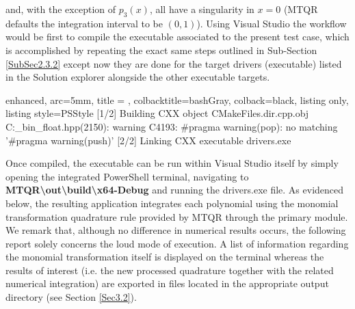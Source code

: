 \documentclass[a4paper, twosided]{book}
\begin{document}
\noindent
and, with the exception of $p_3(x)$, all have a singularity in $x=0$ (MTQR defaults the integration interval to be $(0,1)$). Using Visual Studio the workflow would be first to compile the executable associated to the present test case, which is accomplished by repeating the exact same steps outlined in Sub-Section \ref{SubSec2.3.2} except now they are done for the target \colorbox{poliGrayBlue}{drivers (executable)} listed in the \colorbox{poliGrayBlue}{Solution explorer} alongside the other executable targets.

\vspace{0.2cm}
\begin{tcblisting}{enhanced,
                   arc=5mm,
                   title = \color{black}{\large \ttfamily Compiling the drivers test case},
                   colbacktitle=bashGray,
                   colback=black,
                   listing only,
                   listing style=PSStyle}
[1/2] Building CXX object CMakeFiles\drivers.dir\tests\drivers\main.cpp.obj
C:\boost\boost\multiprecision\cpp_bin_float.hpp(2150): warning C4193: #pragma warning(pop): no matching '#pragma warning(push)'
[2/2] Linking CXX executable drivers.exe
\end{tcblisting}

\noindent
Once compiled, the executable can be run within Visual Studio itself by simply opening the integrated PowerShell terminal, navigating to \colorbox{poliGrayBlue}{\textbf{MTQR\textbackslash out\textbackslash build\textbackslash x64-Debug}} and running the \colorbox{poliGrayBlue}{drivers.exe} file. As evidenced below, the resulting application integrates each polynomial using the monomial transformation quadrature rule provided by MTQR through the primary module. We remark that, although no difference in numerical results occurs, the following report solely concerns the loud mode of execution. A list of information regarding the monomial transformation itself is displayed on the terminal whereas the results of interest (i.e. the new processed quadrature together with the related numerical integration) \color{black} are exported in files located in the appropriate output directory (see Section \ref{Sec3.2}). 
\end{document}
